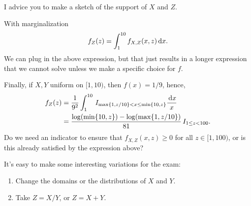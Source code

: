 \documentclass[lectures]{subfiles}
\begin{document}
\begin{exercise}
\begin{solution}
I advice you to make a sketch of the support of $X$ and $Z$.


With marginalization
\begin{equation}
  \label{eq:21}
f_{Z}(z) =
\int_{1}^{10} f_{X,Z}(x,z) \,\textrm{d}x.
\end{equation}
We can plug in the above expression, but that just results in a longer expression that we cannot solve unless we make a specific choice for $f$.

Finally, if $X,Y$ uniform on $[1,10)$, then $f(x)=1/9$, hence,
\begin{align}
  \label{eq:21}
f_{Z}(z)
&=\frac{1}{9^{2}}\int_{1}^{10}  \,I_{\max\{1, z/10\}< x \leq \min\{10, z\}} \frac{\,\textrm{d}x}{x}\\
&=\frac{\log(\min\{10, z\}) - \log(\max\{1, z/10\})}{81} \,I_{1\leq z < 100}.
\end{align}
Do we need an indicator to ensure that $f_{X,Z}(x,z)\geq0$ for all $z \in [1, 100)$, or is this already satisfied by the expression above?

It's easy to make some interesting variations for the exam:
\begin{enumerate}
\item Change the domains or the distributions of $X$ and $Y$.
\item Take $Z=X/Y$, or $Z=X+Y$.
\end{enumerate}

\end{solution}
\end{exercise}
\end{document}
